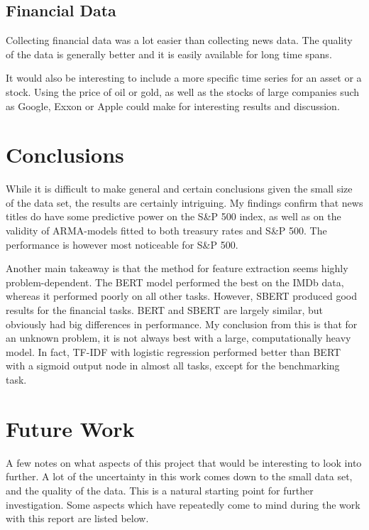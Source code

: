 \subsection{Financial Data}

Collecting financial data was a lot easier than collecting news data. The quality of the data is generally better and it is easily available for long time spans. 

It would also be interesting to include a more specific time series for an asset or a stock. Using the price of oil or gold, as well as the stocks of large companies such as Google, Exxon or Apple could make for interesting results and discussion. 

\section{Conclusions}

While it is difficult to make general and certain conclusions given the small size of the data set, the results are certainly intriguing. My findings confirm that news titles do have some predictive power on the S\&P 500 index, as well as on the validity of ARMA-models fitted to both treasury rates and S\&P 500. The performance is however most noticeable for S\&P 500. 

Another main takeaway is that the method for feature extraction seems highly problem-dependent. The BERT model performed the best on the IMDb data, whereas it performed poorly on all other tasks. However, SBERT produced good results for the financial tasks. BERT and SBERT are largely similar, but obviously had big differences in performance. My conclusion from this is that for an unknown problem, it is not always best with a large, computationally heavy model. In fact, TF-IDF with logistic regression performed better than BERT with a sigmoid output node in almost all tasks, except for the benchmarking task. 



\section{Future Work}

A few notes on what aspects of this project that would be interesting to look into further. A lot of the uncertainty in this work comes down to the small data set, and the quality of the data. This is a natural starting point for further investigation. Some aspects which have repeatedly come to mind during the work with this report are listed below. 

